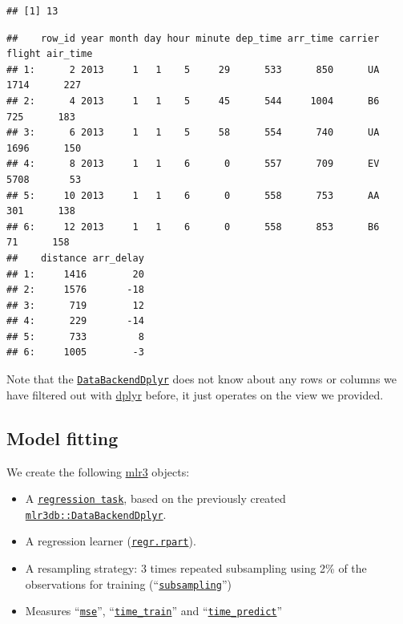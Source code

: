 \documentclass[]{scrbook}
\newenvironment{Shaded}{\begin{snugshade}}{\end{snugshade}}
\newcommand{\KeywordTok}[1]{\textcolor[rgb]{0.13,0.29,0.53}{\textbf{#1}}}
\newcommand{\NormalTok}[1]{#1}
\newcommand{\OperatorTok}[1]{\textcolor[rgb]{0.81,0.36,0.00}{\textbf{#1}}}
\providecommand{\tightlist}{%
  \setlength{\itemsep}{0pt}\setlength{\parskip}{0pt}}
\renewenvironment{Shaded} {\begin{snugshade}\small} {\end{snugshade}}
\begin{document}
\begin{verbatim}
## [1] 13
\end{verbatim}

\begin{Shaded}
\end{Shaded}

\begin{verbatim}
##    row_id year month day hour minute dep_time arr_time carrier flight air_time
## 1:      2 2013     1   1    5     29      533      850      UA   1714      227
## 2:      4 2013     1   1    5     45      544     1004      B6    725      183
## 3:      6 2013     1   1    5     58      554      740      UA   1696      150
## 4:      8 2013     1   1    6      0      557      709      EV   5708       53
## 5:     10 2013     1   1    6      0      558      753      AA    301      138
## 6:     12 2013     1   1    6      0      558      853      B6     71      158
##    distance arr_delay
## 1:     1416        20
## 2:     1576       -18
## 3:      719        12
## 4:      229       -14
## 5:      733         8
## 6:     1005        -3
\end{verbatim}

Note that the \href{https://mlr3db.mlr-org.com/reference/DataBackendDplyr.html}{\texttt{DataBackendDplyr}} does not know about any rows or columns we have filtered out with \href{https://cran.r-project.org/package=dplyr}{dplyr} before, it just operates on the view we provided.

\hypertarget{model-fitting}{%
\subsection{Model fitting}\label{model-fitting}}

We create the following \href{https://mlr3.mlr-org.com}{mlr3} objects:

\begin{itemize}
\tightlist
\item
  A \href{https://mlr3.mlr-org.com/reference/TaskRegr.html}{\texttt{regression\ task}}, based on the previously created \href{https://mlr3db.mlr-org.com/reference/DataBackendDplyr.html}{\texttt{mlr3db::DataBackendDplyr}}.
\item
  A regression learner (\href{https://mlr3.mlr-org.com/reference/mlr_learners_regr.rpart.html}{\texttt{regr.rpart}}).
\item
  A resampling strategy: 3 times repeated subsampling using 2\% of the observations for training (``\href{https://mlr3.mlr-org.com/reference/mlr_resamplings_subsampling.html}{\texttt{subsampling}}'')
\item
  Measures ``\href{https://mlr3.mlr-org.com/reference/mlr_measures_regr.mse.html}{\texttt{mse}}'', ``\href{https://mlr3.mlr-org.com/reference/mlr_measures_elapsed_time.html}{\texttt{time\_train}}'' and ``\href{https://mlr3.mlr-org.com/reference/mlr_measures_elapsed_time.html}{\texttt{time\_predict}}''
\end{itemize}
\end{document}
